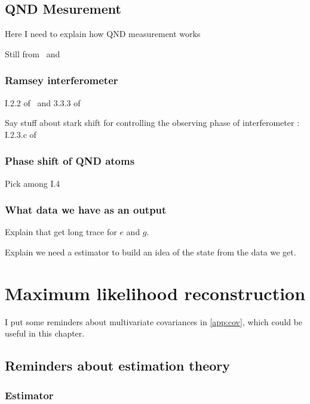 \documentclass[10pt]{report}
\theoremstyle{plain}
\theoremstyle{definition}
\theoremstyle{remark}
\begin{document}

\section{QND Mesurement}

Here I need to explain how QND measurement works

Still from~\cite{Har06} and~\cite{SayPHD11}

\subsection{Ramsey interferometer}

I.2.2 of~\cite{SayPHD11} and 3.3.3 of ~\cite{Har06}

Say stuff about stark shift for controlling the observing phase of
interferometer : I.2.3.c of~\cite{SayPHD11}

\subsection{Phase shift of QND atoms}

Pick among I.4~\cite{SayPHD11}

\subsection{What data we have as an output}

Explain that get long trace for $e$ and $g$.

Explain we need a estimator to build an idea of the state from the data we get.





\chapter{Maximum likelihood reconstruction}

I put some reminders about multivariate covariances in
\cref{app:cov}, which could be useful in this chapter.

\section{Reminders about estimation theory}

\subsection{Estimator}
\end{document}
